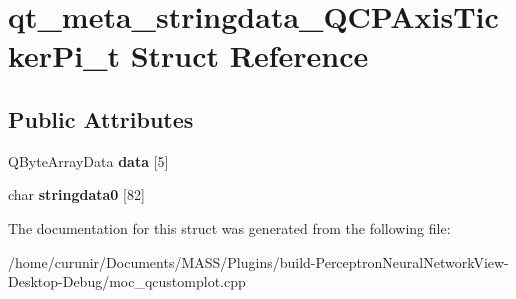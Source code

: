 \hypertarget{structqt__meta__stringdata___q_c_p_axis_ticker_pi__t}{}\section{qt\+\_\+meta\+\_\+stringdata\+\_\+\+Q\+C\+P\+Axis\+Ticker\+Pi\+\_\+t Struct Reference}
\label{structqt__meta__stringdata___q_c_p_axis_ticker_pi__t}
\subsection*{Public Attributes}
\begin{DoxyCompactItemize}
\item 
Q\+Byte\+Array\+Data {\bfseries data} \mbox{[}5\mbox{]}\hypertarget{structqt__meta__stringdata___q_c_p_axis_ticker_pi__t_a9f99bf64eee1204b7290801f16f2f970}{}\label{structqt__meta__stringdata___q_c_p_axis_ticker_pi__t_a9f99bf64eee1204b7290801f16f2f970}

\item 
char {\bfseries stringdata0} \mbox{[}82\mbox{]}\hypertarget{structqt__meta__stringdata___q_c_p_axis_ticker_pi__t_a09df8d6e526c01eb8d476aad32b2ab37}{}\label{structqt__meta__stringdata___q_c_p_axis_ticker_pi__t_a09df8d6e526c01eb8d476aad32b2ab37}

\end{DoxyCompactItemize}


The documentation for this struct was generated from the following file\+:\begin{DoxyCompactItemize}
\item 
/home/curunir/\+Documents/\+M\+A\+S\+S/\+Plugins/build-\/\+Perceptron\+Neural\+Network\+View-\/\+Desktop-\/\+Debug/moc\+\_\+qcustomplot.\+cpp\end{DoxyCompactItemize}
